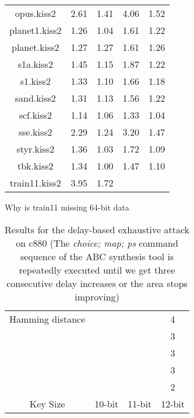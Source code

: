 \begin{table*}
\begin{tabular}{ | c | c | c | c | c | }
opus.kiss2&2.61&1.41&4.06&1.52\\
planet1.kiss2&1.26&1.04&1.61&1.22\\
planet.kiss2&1.27&1.27&1.61&1.26\\
s1a.kiss2&1.45&1.15&1.87&1.22\\
s1.kiss2&1.33&1.10&1.66&1.18\\
sand.kiss2&1.31&1.13&1.56&1.22\\
scf.kiss2&1.14&1.06&1.33&1.04\\
sse.kiss2&2.29&1.24&3.20&1.47\\
styr.kiss2&1.36&1.03&1.72&1.09\\
tbk.kiss2&1.34&1.00&1.47&1.10\\
train11.kiss2&3.95&1.72&&\\
\hline
\end{tabular}
\end{table*}

Why is train11 missing 64-bit data







\begin{table}
\caption{Results for the delay-based exhaustive attack on c880 (The \emph{choice; map; ps} command sequence of the ABC synthesis tool is repeatedly executed until we get three consecutive delay increases or the area stops improving)}
\begin{tabular}{ | c | c | c | c | }
\hline
Hamming distance & &  & 4 \\
&&  & 3 \\
&&  & 3 \\
&&  & 3 \\
&&  & 2 \\
\hline
Key Size & 10-bit & 11-bit & 12-bit \\
\hline
\end{tabular}
\end{table}

